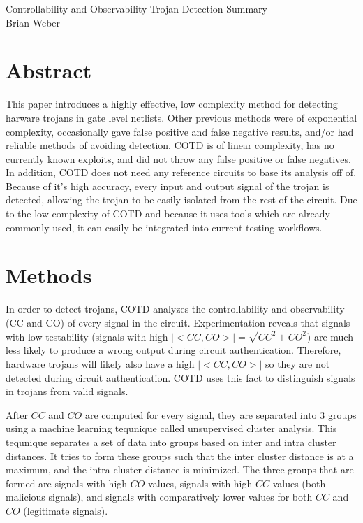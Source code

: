 \documentclass[12pt]{article}
\begin{document}
\begin{center}
\Large Controllability and Observability Trojan Detection Summary \\
\normalsize Brian Weber
\end{center}
\section{Abstract}
This paper introduces a highly effective, low complexity method for detecting harware trojans in gate level netlists. Other previous methods were of exponential complexity, occasionally gave false positive and false negative results, and/or had reliable methods of avoiding detection. COTD is of linear complexity, has no currently known exploits, and did not throw any false positive or false negatives. In addition, COTD does not need any reference circuits to base its analysis off of. Because of it's high accuracy, every input and output signal of the trojan is detected, allowing the trojan to be easily isolated from the rest of the circuit. Due to the low complexity of COTD and because it uses tools which are already commonly used, it can easily be integrated into current testing workflows.

\section{Methods}
In order to detect trojans, COTD analyzes the controllability and observability (CC and CO) of every signal in the circuit. Experimentation reveals that signals with low testability (signals with high $|<CC,CO>|=\sqrt{CC^2+CO^2}$) are much less likely to produce a wrong output during circuit authentication. Therefore, hardware trojans will likely also have a high $|<CC,CO>|$ so they are not detected during circuit authentication. COTD uses this fact to distinguish signals in trojans from valid signals.

After $CC$ and $CO$ are computed for every signal, they are separated into 3 groups using a machine learning tequnique called unsupervised cluster analysis. This tequnique separates a set of data into groups based on inter and intra cluster distances. It tries to form these groups such that the inter cluster distance is at a maximum, and the intra cluster distance is minimized. The three groups that are formed are signals with high $CO$ values, signals with high $CC$ values (both malicious signals), and signals with comparatively lower values for both $CC$ and $CO$ (legitimate signals). 
\end{document}
